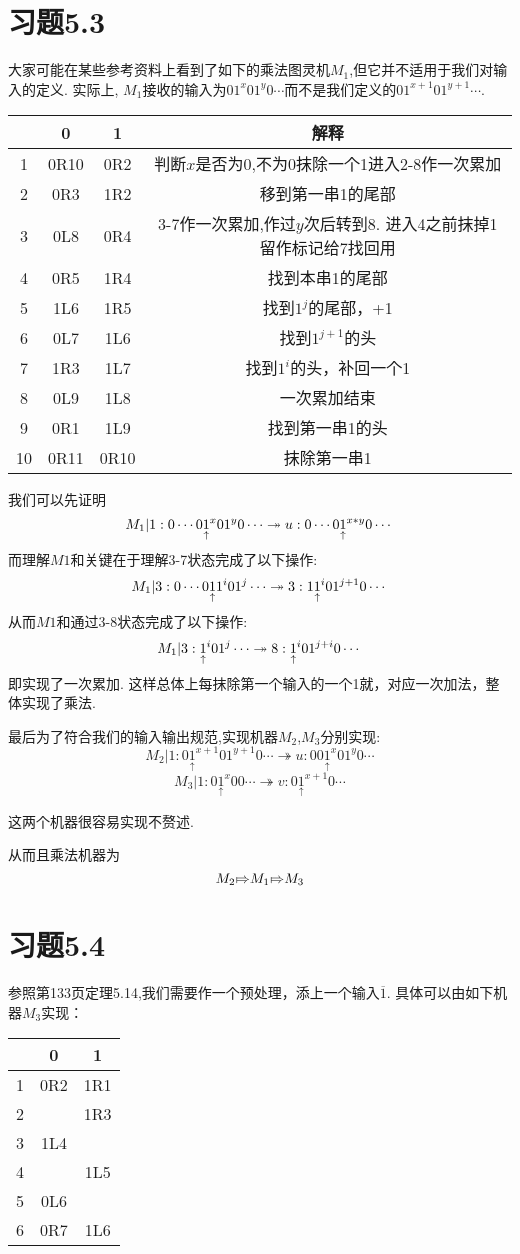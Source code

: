 \documentclass{article}
\newcommand*{\pt}[1]{\ensuremath{\underset{\uparrow}{#1}}}
\newcommand{\RA}[0]{{\shortmid\!\Rightarrow}}
\begin{document}
\section*{习题5.3}
大家可能在某些参考资料上看到了如下的乘法图灵机$M_1$,但它并不适用于我们对输入的定义. 实际上, $M_1$接收的输入为$01^x01^y0\cdots$而不是我们定义的$01^{x+1}01^{y+1}\cdots$. 
\begin{center}
\begin{tabular}{|c|c|c|c|}
	\hline
	&0&1&解释\\
	\hline
	1&0R10&0R2&判断$x$是否为0,不为0抹除一个1进入2-8作一次累加\\
	2&0R3&1R2&移到第一串1的尾部\\
	3&0L8&0R4&3-7作一次累加,作过$y$次后转到8. 进入4之前抹掉1留作标记给7找回用\\
	4&0R5&1R4&找到本串1的尾部\\
	5&1L6&1R5&找到$1^j$的尾部，+1\\
	6&0L7&1L6&找到$1^{j+1}$的头\\
	7&1R3&1L7&找到$1^{i}$的头，补回一个1\\
	8&0L9&1L8&一次累加结束\\
	9&0R1&1L9&找到第一串1的头\\
	10&0R11&0R10&抹除第一串1\\
	\hline
\end{tabular}
\end{center}
我们可以先证明
$$M_1 | 1 : 0\cdots0\pt1^x01^y0\cdots \twoheadrightarrow u : 0\cdots0\pt1^{x*y}0\cdots\\$$
而理解$M1$和关键在于理解3-7状态完成了以下操作:
$$M_1 | 3 : 0\cdots0\pt11^i01^j\cdots \twoheadrightarrow 3 : 1\pt1^i01^{j+1}0\cdots\\$$
从而$M1$和通过3-8状态完成了以下操作:
$$M_1 | 3 : \pt1^i01^j\cdots \twoheadrightarrow 8 : \pt1^i01^{j+i}0\cdots\\$$
即实现了一次累加. 
这样总体上每抹除第一个输入的一个1就，对应一次加法，整体实现了乘法. 


最后为了符合我们的输入输出规范,实现机器$M_2$,$M_3$分别实现:
$$M_2 | 1 : 0\pt1^{x+1}01^{y+1}0\cdots \twoheadrightarrow u : 00\pt1^x01^y0\cdots$$
$$M_3 | 1 : 0\pt1^{x}00\cdots \twoheadrightarrow v : 0\pt1^{x+1}0\cdots$$

这两个机器很容易实现不赘述.

从而且乘法机器为
$$M_2\RA M_1\RA M_3$$

\section*{习题5.4}
 参照第133页定理5.14,我们需要作一个预处理，添上一个输入$\overline 1$. 具体可以由如下机器$M_3$实现：
\begin{center}
\begin{tabular}{|c|c|c|}
	\hline
	&0&1\\
	\hline
	1&0R2&1R1\\
	2&&1R3\\
	3&1L4&\\
	4&&1L5\\
	5&0L6&\\
	6&0R7&1L6
	\\
	\hline
\end{tabular}
\end{center}
\end{document}
